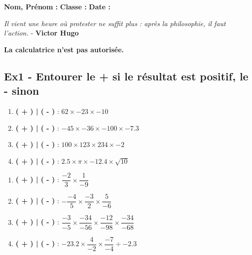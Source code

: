 \documentclass[12pt]{article}
\begin{document}

\textbf{Nom, Prénom :} \hspace{8cm} \textbf{Classe :} \hspace{3cm} \textbf{Date :}

\begin{center}
  \textit{Il vient une heure où protester ne suffit plus : après la philosophie, il faut l’action.}  - \textbf{Victor Hugo}

\end{center}

\textbf{La calculatrice n'est pas autorisée.}

\subsection*{Ex1 - Entourer le + si le résultat est positif, le - sinon}

\begin{multicols}{2}
  
  \begin{enumerate}
  \item[] \textbf{( + ) | ( - )} : $ 62 \times -23 \times -10$\\
  \item[] \textbf{( + ) | ( - )} : $ -45 \times -36 \times -100 \times -7.3$\\
  \item[] \textbf{( + ) | ( - )} : $ 100 \times 123 \times 234 \times -2$\\
  \item[] \textbf{( + ) | ( - )} : $ 2.5 \times \pi \times -12.4 \times \sqrt{10}$\\
  \end{enumerate}

  \begin{enumerate}
  \item[] \textbf{( + ) | ( - )} :  $ \dfrac{-2}{3} \times \dfrac{1}{-9} $ \\
  \item[] \textbf{( + ) | ( - )} :  $ - \dfrac{-4}{5} \times \dfrac{-3}{2} \times \dfrac{5}{-6}$ \\
  \item[] \textbf{( + ) | ( - )} :  $ \dfrac{-3}{-5} \times \dfrac{-34}{-56} \times \dfrac{-12}{-98} \times  \dfrac{-34}{-68} $ \\
  \item[] \textbf{( + ) | ( - )} :  $ -23.2 \times \dfrac{4}{-2} \times \dfrac{-7}{-4} \div -2.3$ \\
  \end{enumerate}

\end{multicols}
\end{document}
